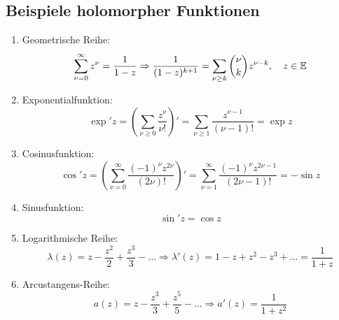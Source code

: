 \subsection{Beispiele holomorpher Funktionen}
\begin{enumerate}
	\item Geometrische Reihe:
	\[ \sum_{\nu=0}^\infty z^\nu=\frac{1}{1-z}\Rightarrow\frac{1}{(1-z)^{k+1}}=\sum_{\nu\geq k}^{}\binom{\nu}{k}z^{\nu-k},\quad z\in\mathbb{E}  \]
	\item Exponentialfunktion:
	\[ \exp' z=\left(\sum_{\nu\geq 0}^{}\frac{z^\nu}{\nu!}\right)'=\sum_{\nu\geq 1}^{}\frac{z^{\nu-1}}{(\nu-1)!}=\exp z \]
	\item Cosinusfunktion:
	\[ \cos' z=\left(\sum_{\nu=0}^{\infty}\frac{(-1)^\nu z^{2\nu}}{(2\nu)!}\right)'=\sum_{\nu=1}^{\infty}\frac{(-1)^\nu z^{2\nu-1}}{(2\nu-1)!}=-\sin z \]
	\item Sinusfunktion:
	\[ \sin' z=\cos z \]
	\item Logarithmische Reihe:
	\[ \lambda(z)=z-\frac{z^2}{2}+\frac{z^3}{3}-...\Rightarrow\lambda'(z)=1-z+z^2-z^3+...=\frac{1}{1+z} \]
	\item Arcustangens-Reihe:
	\[ a(z)=z-\frac{z^3}{3}+\frac{z^5}{5}-...\Rightarrow a'(z)=\frac{1}{1+z^2} \]
\end{enumerate}
